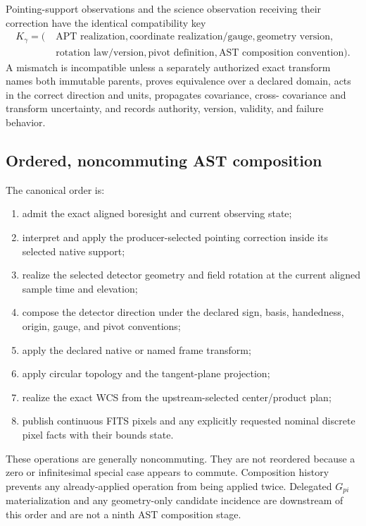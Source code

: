 Pointing-support observations and the science observation receiving their
correction have the identical compatibility key
\begin{equation}
 \begin{aligned}
 K_\gamma=(\;&\text{APT realization},
 \text{coordinate realization/gauge},\text{geometry version},\\
 &\text{rotation law/version},\text{pivot definition},
 \text{AST composition convention}).
 \end{aligned}
 \label{eq:geometry-key}
\end{equation}
A mismatch is incompatible unless a separately authorized exact transform
names both immutable parents, proves equivalence over a declared domain,
acts in the correct direction and units, propagates covariance, cross-
covariance and transform uncertainty, and records authority, version,
validity, and failure behavior.

\subsection{Ordered, noncommuting AST composition}
\label{sec:ordered-composition}

The canonical order is:
\begin{enumerate}[label=\arabic*.]
  \item admit the exact aligned boresight and current observing state;
  \item interpret and apply the producer-selected pointing correction inside
        its selected native support;
  \item realize the selected detector geometry and field rotation at the
        current aligned sample time and elevation;
  \item compose the detector direction under the declared sign, basis,
        handedness, origin, gauge, and pivot conventions;
  \item apply the declared native or named frame transform;
  \item apply circular topology and the tangent-plane projection;
  \item realize the exact WCS from the upstream-selected center/product plan;
  \item publish continuous FITS pixels and any explicitly requested nominal
        discrete pixel facts with their bounds state.
\end{enumerate}
These operations are generally noncommuting.  They are not reordered because
a zero or infinitesimal special case appears to commute.  Composition history
prevents any already-applied operation from being applied twice.  Delegated
$G_{pi}$ materialization and any geometry-only candidate incidence are
downstream of this order and are not a ninth AST composition stage.

